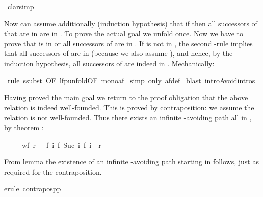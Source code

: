 \begin{isabellebody}
\ clarsimp{\isacharparenright}%
\begin{isamarkuptxt}%
\noindent
Now can assume additionally (induction hypothesis) that if 
then all successors of  that are in  are in
. To prove the actual goal we unfold  once. Now
we have to prove that  is in  or all successors of  are in . If  is not in , the second
-rule implies that all successors of  are in
 (because we also assume ), and
hence, by the induction hypothesis, all successors of  are indeed in
. Mechanically:%
\end{isamarkuptxt}%
\ rule\ ssubst\ {\isacharbrackleft}OF\ lfp{\isacharunderscore}unfold{\isacharbrackleft}OF\ mono{\isacharunderscore}af{\isacharbrackright}{\isacharbrackright}{\isacharparenright}\isanewline
\ simp\ only{\isacharcolon}\ af{\isacharunderscore}def{\isacharparenright}\isanewline
\ blast\ intro{\isacharcolon}Avoid{\isachardot}intros{\isacharparenright}%
\begin{isamarkuptxt}%
Having proved the main goal we return to the proof obligation that the above
relation is indeed well-founded. This is proved by contraposition: we assume
the relation is not well-founded. Thus there exists an infinite -avoiding path all in , by theorem
:
\begin{isabelle}%
\ \ \ \ \ wf\ r\ {\isacharequal}\ {\isacharparenleft}{\isasymnot}\ {\isacharparenleft}{\isasymexists}f{\isachardot}\ {\isasymforall}i{\isachardot}\ {\isacharparenleft}f\ {\isacharparenleft}Suc\ i{\isacharparenright}{\isacharcomma}\ f\ i{\isacharparenright}\ {\isasymin}\ r{\isacharparenright}{\isacharparenright}%
\end{isabelle}
From lemma  the existence of an infinite
-avoiding path starting in  follows, just as required for
the contraposition.%
\end{isamarkuptxt}%
erule\ contrapos{\isacharunderscore}pp{\isacharparenright}\isanewline

\end{isabellebody}
